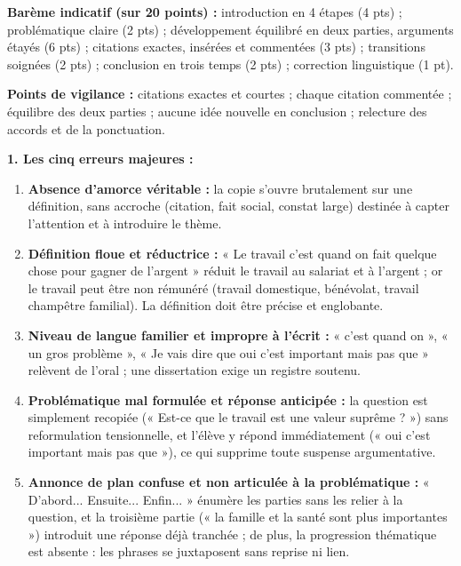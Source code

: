 \documentclass[11pt]{article}
\newcommand{\cle}[1]{{\popxbold\color{popdark}#1}}
\begin{document}
\begin{corrige}
\textbf{Barème indicatif (sur 20 points) :} introduction en 4 étapes (4 pts) ; problématique claire (2 pts) ; développement équilibré en deux parties, arguments étayés (6 pts) ; citations exactes, insérées et commentées (3 pts) ; transitions soignées (2 pts) ; conclusion en trois temps (2 pts) ; correction linguistique (1 pt).

\textbf{Points de vigilance :} citations exactes et courtes ; chaque citation commentée ; équilibre des deux parties ; aucune idée nouvelle en conclusion ; relecture des accords et de la ponctuation.
\end{corrige}

\begin{corrige}
\textbf{1. Les cinq erreurs majeures :}
\begin{enumerate}
\item \textbf{Absence d'amorce véritable :} la copie s'ouvre brutalement sur une définition, sans accroche (citation, fait social, constat large) destinée à capter l'attention et à introduire le thème.
\item \textbf{Définition floue et réductrice :} « Le travail c'est quand on fait quelque chose pour gagner de l'argent » réduit le travail au salariat et à l'argent ; or le travail peut être non rémunéré (travail domestique, bénévolat, travail champêtre familial). La définition doit être précise et englobante.
\item \textbf{Niveau de langue familier et impropre à l'écrit :} « c'est quand on », « un gros problème », « Je vais dire que oui c'est important mais pas que » relèvent de l'oral ; une dissertation exige un registre soutenu.
\item \textbf{Problématique mal formulée et réponse anticipée :} la question est simplement recopiée (« Est-ce que le travail est une valeur suprême ? ») sans reformulation tensionnelle, et l'élève y répond immédiatement (« oui c'est important mais pas que »), ce qui supprime toute suspense argumentative.
\item \textbf{Annonce de plan confuse et non articulée à la problématique :} « D'abord... Ensuite... Enfin... » énumère les parties sans les relier à la question, et la troisième partie (« la famille et la santé sont plus importantes ») introduit une réponse déjà tranchée ; de plus, la \cle{progression thématique} est absente : les phrases se juxtaposent sans reprise ni lien.
\end{enumerate}


\end{corrige}
\end{document}
